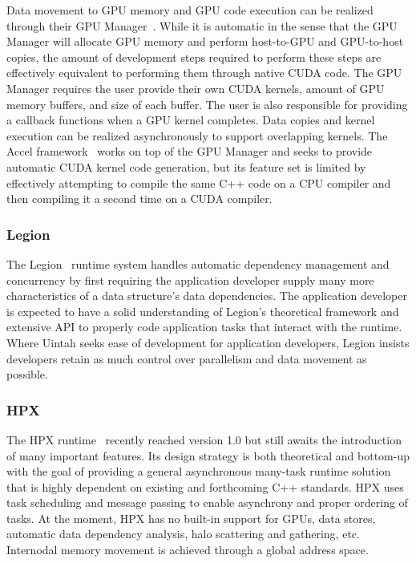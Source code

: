 \documentclass[12pt]{article}
\begin{document}
Data movement to GPU memory and GPU code execution can be realized through their GPU Manager~\cite{charmpp-masters-gpumanager}.   While it is automatic in the sense that the GPU Manager will allocate GPU memory and perform host-to-GPU and GPU-to-host copies, the amount of development steps required to perform these steps are effectively equivalent to performing them through native CUDA code.  The GPU Manager requires the user provide their own CUDA kernels, amount of GPU memory buffers, and size of each buffer.  The user is also responsible for providing a callback functions when a GPU kernel completes.   Data copies and kernel execution can be realized asynchronously to support overlapping kernels.  The Accel framework~\cite{charmpp-thesis-accel} works on top of the GPU Manager and seeks to provide automatic CUDA kernel code generation, but its feature set is limited by effectively attempting to compile the same C++ code on a CPU compiler and then compiling it a second time on a CUDA compiler.

\subsubsection{Legion}
\label{ch:legion}
The Legion~\cite{legion2012} runtime system handles automatic dependency management and concurrency by first requiring the application developer supply many more characteristics of a data structure's data dependencies.  The application developer is expected to have a solid understanding of Legion's theoretical framework and extensive API to properly code application tasks that interact with the runtime.  Where Uintah seeks ease of development for application developers, Legion insists developers retain as much control over parallelism and data movement as possible.  

\subsubsection{HPX}
\label{ch:hpx}
The HPX runtime~\cite{HPX-scaling-global-address-space} recently reached version 1.0 but still awaits the introduction of many important features.  Its design strategy is both theoretical and bottom-up with the goal of providing a general asynchronous many-task runtime solution that is highly dependent on existing and forthcoming C++ standards.   HPX uses task scheduling and message passing to enable asynchrony and proper ordering of tasks.  At the moment, HPX has no built-in support for GPUs, data stores, automatic data dependency analysis, halo scattering and gathering, etc.   Internodal memory movement is achieved through a global address space.
\end{document}
